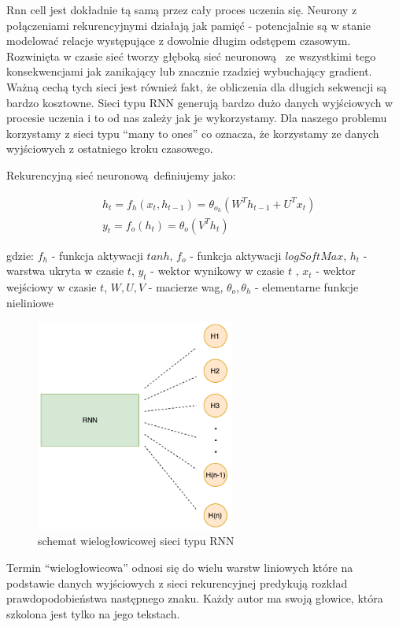 Rnn cell jest dokładnie tą samą przez cały proces
uczenia się. Neurony z połączeniami rekurencyjnymi działają jak pamięć - potencjalnie są w stanie modelować relacje
występujące z dowolnie długim odstępem czasowym. 
Rozwinięta w czasie sieć tworzy głęboką sieć neuronową 
ze wszystkimi tego konsekwencjami jak zanikający lub znacznie rzadziej wybuchający gradient. 
Ważną cechą tych sieci jest również fakt, że obliczenia dla długich sekwencji są bardzo kosztowne.
Sieci typu RNN generują bardzo dużo danych wyjściowych w procesie uczenia i to od nas zależy jak je 
wykorzystamy. Dla naszego problemu korzystamy z sieci typu ``many to ones'' co oznacza, że korzystamy
ze danych wyjściowych z ostatniego kroku czasowego.

Rekurencyjną sieć neuronową definiujemy jako:

\begin{align}
  &h_t = f_h(x_t, h_{t-1}) = \theta_o_h(W^Th_{t-1} + U^Tx_t) \\ 
  &y_t = f_o(h_t) = \theta_o(V^Th_t)
\end{align}

gdzie: \newline
$f_h$ - funkcja aktywacji $tanh$, \newline
$f_o$ - funkcja aktywacji $logSoftMax$, \newline
$h_t$ - warstwa ukryta w czasie $t$, \newline
$y_t$ - wektor wynikowy w czasie $t$ , \newline
$x_t$ - wektor wejściowy w czasie $t$, \newline
$W, U, V$ - macierze wag, \newline
$\theta_o, \theta_h$ - elementarne funkcje nieliniowe \newline


\begin{figure}[H]
\centering
\includegraphics[height=7cm]{./images/multiheaded-rnn.png}
\caption{schemat wielogłowicowej sieci typu RNN}
\label{fig:test5}
\end{figure}

Termin ``wielogłowicowa'' odnosi się do wielu warstw liniowych które na podstawie danych wyjściowych z 
sieci rekurencyjnej predykują rozkład prawdopodobieństwa następnego znaku. Każdy autor ma swoją głowice, która 
szkolona jest tylko na jego tekstach.



